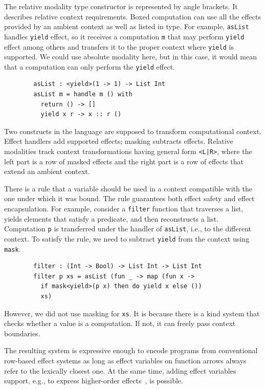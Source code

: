 \documentclass[conference]{IEEEtran}
\begin{document}
    The relative modality type constructor is represented by angle brackets.
    It describes relative context requirements.
    Boxed computation can use all the effects provided by an ambient context as well as listed in type.
    For example, \texttt{asList} handles \texttt{yield} effect, so it receives a computation \texttt{m} that may perform \texttt{yield} effect among others and transfers it to the proper context where \texttt{yield} is supported.
    We could use absolute modality here, but in this case, it would mean that a computation can only perform the \texttt{yield} effect.
    \begin{verbatim}
        asList : <yield>(1 -> 1) -> List Int
        asList m = handle m () with
          return () -> []
          yield x r -> x :: r ()
    \end{verbatim}

    Two constructs in the language are supposed to transform computational context.
    Effect handlers add supported effects; masking subtracts effects.
    Relative modalities track context transformations having general form \texttt{<L|R>}, where the left part is a row of masked effects and the right part is a row of effects that extend an ambient context.

    There is a rule that a variable should be used in a context compatible with the one under which it was bound.
    The rule guarantees both effect safety and effect encapsulation.
    For example, consider a \texttt{filter} function that traverses a list, yields elements that satisfy a predicate, and then reconstructs a list.
    Computation \texttt{p} is transferred under the handler of \texttt{asList}, i.e., to the different context.
    To satisfy the rule, we need to subtract \texttt{yield} from the context using \texttt{mask}.
    \begin{verbatim}
        filter : (Int -> Bool) -> List Int -> List Int
        filter p xs = asList (fun _ -> map (fun x ->
          if mask<yield>(p x) then do yield x else ())
          xs)
    \end{verbatim}

    However, we did not use masking for \texttt{xs}.
    It is because there is a kind system that checks whether a value is a computation.
    If not, it can freely pass context boundaries.

    The resulting system is expressive enough to encode programs from conventional row-based effect systems as long as effect variables on function arrows always refer to the lexically closest one.
    At the same time, adding effect variables support, e.g., to express higher-order effects~\cite{wu2014effect}, is possible.
\end{document}
